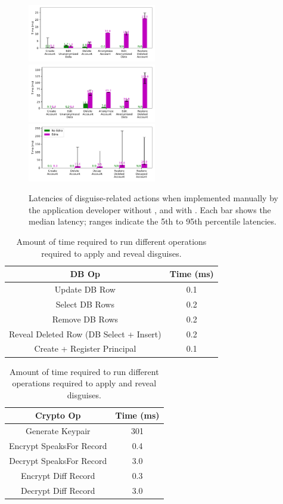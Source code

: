 \begin{figure}[t]
    \centering
    \includegraphics[width=0.5\textwidth]{figs/websubmit_op_stats}
    \includegraphics[width=0.5\textwidth]{figs/hotcrp_op_stats}
    \includegraphics[width=0.5\textwidth]{figs/lobsters_op_stats}
    \caption{Latencies of disguise-related actions when implemented manually by the
    application developer without \sys, and with \sys.
    Each bar shows the median latency; ranges indicate the 5th to 95th
    percentile latencies.}
    \label{fig:client_opstats}
\end{figure}

\begin{table}[h!]
\begin{center}
\begin{tabular}{ c c }
\textbf{DB Op} & \textbf{Time (ms)}\\
\hline
Update DB Row & 0.1\\
Select DB Rows & 0.2\\
Remove DB Rows & 0.2\\
Reveal Deleted Row (DB Select + Insert) & 0.2 \\
Create + Register Principal & 0.1\\
\end{tabular}
\quad
\begin{tabular}{ c c }
\textbf{Crypto Op} & \textbf{Time (ms)}\\
\hline
Generate Keypair & 301\\
Encrypt SpeaksFor Record & 0.4\\
Decrypt SpeaksFor Record & 3.0\\
Encrypt Diff Record & 0.3\\
Decrypt Diff Record & 3.0\\
\end{tabular}
\end{center}
\caption{Amount of time required to run different operations required to apply and reveal disguises.}
\label{tab:opstats}
\end{table}

